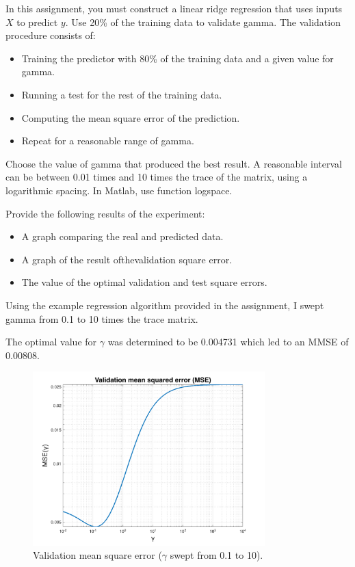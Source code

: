 \documentclass[11pt]{article}
\begin{document}
In this assignment, you must construct a linear ridge regression that uses inputs \(X\) to predict \(y\). Use 20\% of the training data to validate gamma. The validation procedure consists of:

\begin{itemize}
    \item Training the predictor with 80\% of the training data and a given value for gamma.
    \item Running a test for the rest of the training data.
    \item Computing the mean square error of the prediction.
    \item Repeat for a reasonable range of gamma.
\end{itemize}

Choose the value of gamma that produced the best result. A reasonable interval can be between 0.01 times and 10 times the trace of the matrix, using a logarithmic spacing. In Matlab, use function logspace.

Provide the following results of the experiment:

\begin{itemize}
    \item A graph comparing the real and predicted data.
    \item A graph of the result ofthevalidation square error.
    \item The value of the optimal validation and test square errors.
\end{itemize}

\begin{tcolorbox}[colback=CrispBlue!5!white,colframe=CrispBlue!75!black,title=Construction of a regression algorithm with the model parameters.]
Using the example regression algorithm provided in the assignment, I swept gamma from 0.1 to 10 times the trace matrix.\vspace{1em}

The optimal value for \(\gamma\) was determined to be 0.004731 which led to an MMSE of 0.00808.

\end{tcolorbox}

\begin{figure}[h!]
    \centering
    \includegraphics[width=0.8\textwidth]{figure_0.png}
    \vspace{-1em}\caption{Validation mean square error (\(\gamma\) swept from 0.1 to 10).}
\end{figure}
\end{document}
